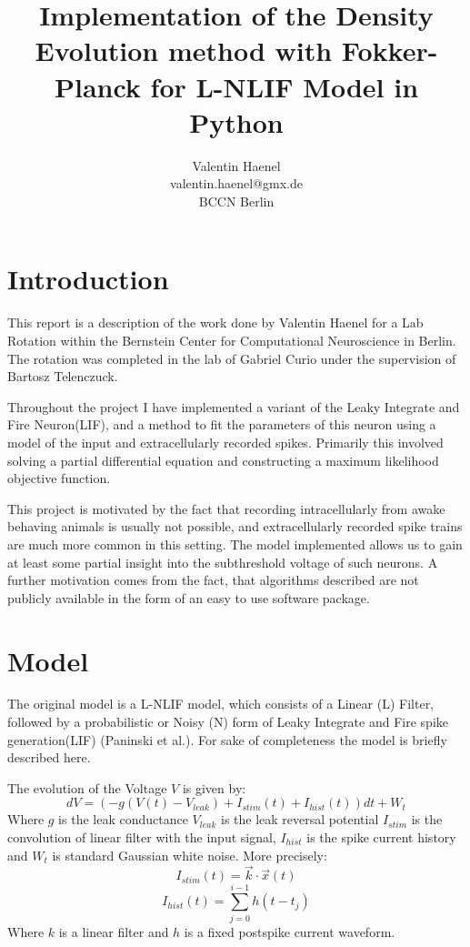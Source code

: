 \documentclass[10pt]{article}
\title{Implementation of the Density Evolution method with
Fokker-Planck for L-NLIF Model in Python}
\author{Valentin Haenel \\
valentin.haenel@gmx.de \\
BCCN Berlin}
\begin{document}
 

\maketitle

\section{Introduction}

This report is a description of the work done by Valentin Haenel
for a Lab Rotation within the Bernstein Center for Computational
Neuroscience in Berlin. The rotation was completed in the lab of Gabriel
Curio under the supervision of Bartosz Telenczuck. 

Throughout the project I have implemented a variant of the Leaky
Integrate and Fire Neuron(LIF), and a method to fit the parameters of this
neuron using a model of the input and extracellularly recorded spikes.
Primarily this involved solving a partial differential equation and constructing
a maximum likelihood objective function. 

This project is motivated by the fact that recording intracellularly from awake
behaving animals is usually not possible, and extracellularly recorded spike
trains are much more common in this setting. The model implemented allows us to
gain at least some partial insight into the subthreshold voltage of such
neurons. A further motivation comes from the fact, that algorithms described are
not publicly available in the form of an easy to use software package. 

\section{Model}
The original model is a L-NLIF model, which consists of a Linear
(L) Filter, followed by a probabilistic or Noisy (N) form of Leaky
Integrate and Fire spike generation(LIF) (Paninski et
al.\cite{PaninskiPillowSimoncelli}). For sake of completeness the
model is briefly described here.

The evolution of the Voltage $V$ is given by:
\begin{equation}
    dV = (-g(V(t) -V_{leak}) +I_{stim}(t) + I_{hist}(t)) dt + W_{t}
\end{equation}
Where $g$ is the leak conductance $V_{leak}$ is the leak reversal
potential $I_{stim}$ is the convolution of linear filter with the
input signal, $I_{hist}$ is the spike current history and $W_t$ is
standard Gaussian white noise. More precisely:
\begin{equation}
    I_{stim}(t) = \vec{k} \cdot  \vec{x}(t) 
\end{equation}
\begin{equation}
    I_{hist}(t) = \sum_{j=0}^{i-1}h(t-t_j)
\end{equation}
Where $k$ is a linear filter and $h$ is a fixed postspike current waveform. 
\end{document}
